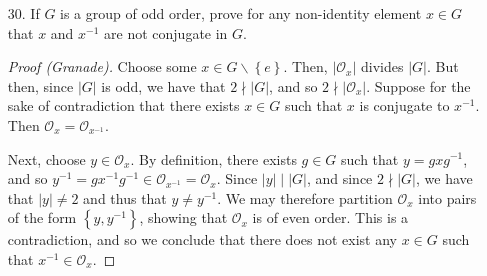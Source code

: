 \documentclass[10pt]{article}
\begin{document}
\begin{itemize}
\begin{proof}(Gillispie) Because $A$ is finite, we know that $G\le S_{A}$,
which has order $|S_{A}|=|A|!$, and so $|G|\le|A|!$ and is thus
finite.\\
Consider $\cup_{a\in A}G_{a}$.\\
Because $G$ is a transitive group, and by proposition 4.1.2, $|A|=|\mathcal{O}_{a}|=|G:G_{a}|$.\\
Since $G$ is finite $|G:G_{a}|=\frac{|G|}{|G_{a}|}$, and so $|G_{a}|=\frac{|G|}{|G:G_{a}|}=\frac{|G|}{|A|}$.\\
I claim that $|\cup_{a\in A}G_{a}|<|G|$, which implies the existance
of $\sigma\in G$ such that $\sigma\notin\cup_{a\in A}G_{a}$, that
is, $\sigma(a)\ne a$ for all $A$.\\
But, notice that $e(a)=a$ for all $a\in A$, and so $e\in G_{a}$
for all $a\in A$, so all stabilizers contain $e$.\\
So\begin{eqnarray*}
|\cup_{a\in A}G_{a}| & \le & 1+\sum_{a\in A}|G_{a}-\{e\}|\\
 & = & 1+\sum_{a\in A}|G_{a}|-1\\
 & = & 1+\sum_{a\in A}\frac{|G|}{|A|}-1\\
 & = & 1+|A|\frac{|G|}{|A|}-|A|\\
 & = & 1+|G|-A\\
 & \le & |G|-1\\
 & < & |G|.\end{eqnarray*}
As needed.
\end{proof}

\item[30.] If $G$ is a group of odd order, prove for any non-identity element
$x\in G$ that $x$ and $x^{-1}$ are not conjugate in $G$.

\begin{proof}[Proof (Granade)]
Choose some $x\in G\backslash\left\{ e\right\} $. Then,
$\left|\mathcal{O}_{x}\right|$ divides $\left|G\right|$. But then,
since $\left|G\right|$ is odd, we have that $2\nmid\left|G\right|$,
and so $2\nmid\left|\mathcal{O}_{x}\right|$. Suppose for the sake of
contradiction that there exists $x\in G$ such that $x$ is conjugate
to $x^{-1}$. Then $\mathcal{O}_{x}=\mathcal{O}_{x^{-1}}$.

Next, choose $y\in\mathcal{O}_{x}$. By definition, there exists
$g\in G$ such that $y=gxg^{-1}$, and so
$y^{-1}=gx^{-1}g^{-1}\in\mathcal{O}_{x^{-1}}=\mathcal{O}_{x}$. Since
$\left|y\right|\mid\left|G\right|$, and since
$2\nmid\left|G\right|$, we have that $\left|y\right|\ne2$ and thus
that $y\ne y^{-1}$. We may therefore partition $\mathcal{O}_{x}$
into pairs of the form $\left\{ y,y^{-1}\right\} $, showing that
$\mathcal{O}_{x}$ is of even order. This is a contradiction, and so
we conclude that there does not exist any $x\in G$ such that
$x^{-1}\in\mathcal{O}_{x}$.
\end{proof}

\end{itemize}

 
\end{document}
